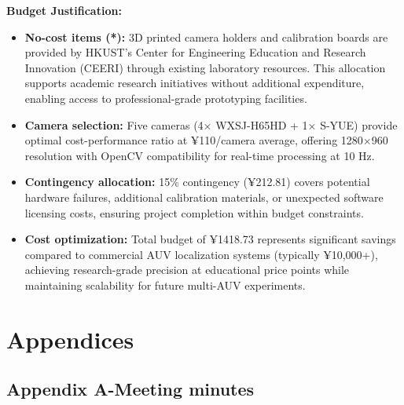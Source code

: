 \documentclass[11pt]{article}
\begin{document}
        \textbf{Budget Justification:}
        \begin{itemize}
            \item \textbf{No-cost items (*):} 3D printed camera holders and calibration boards are provided by HKUST's Center for Engineering Education and Research Innovation (CEERI) through existing laboratory resources. This allocation supports academic research initiatives without additional expenditure, enabling access to professional-grade prototyping facilities.
            \item \textbf{Camera selection:} Five cameras (4× WXSJ-H65HD + 1× S-YUE) provide optimal cost-performance ratio at ¥110/camera average, offering 1280×960 resolution with OpenCV compatibility for real-time processing at 10 Hz.
            \item \textbf{Contingency allocation:} 15\% contingency (¥212.81) covers potential hardware failures, additional calibration materials, or unexpected software licensing costs, ensuring project completion within budget constraints.
            \item \textbf{Cost optimization:} Total budget of ¥1418.73 represents significant savings compared to commercial AUV localization systems (typically ¥10,000+), achieving research-grade precision at educational price points while maintaining scalability for future multi-AUV experiments.
        \end{itemize}
\newpage
{}
    
    

\newpage
\section*{Appendices}
    \subsection*{Appendix A-Meeting minutes}
\end{document}
